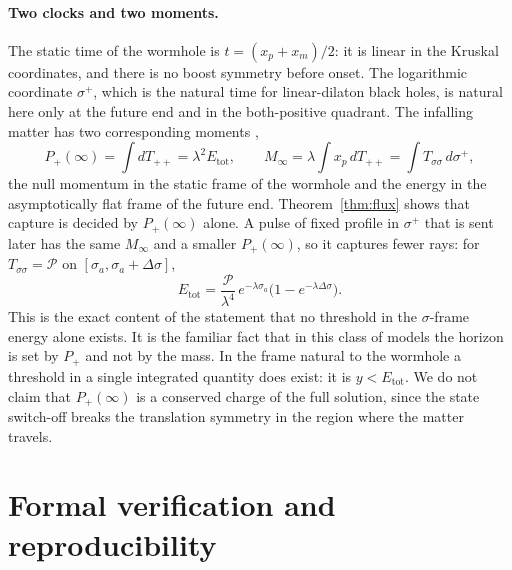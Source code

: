 \documentclass[11pt]{article}
\theoremstyle{remark}
\newcommand{\Etot}{E_{\mathrm{tot}}}
\begin{document}
\paragraph{Two clocks and two moments.} The static time of the wormhole is $t=(x_p+x_m)/2$: it is linear in the Kruskal coordinates, and there is no boost symmetry before onset. The logarithmic coordinate $\sigma^+$, which is the natural time for linear-dilaton black holes, is natural here only at the future end and in the both-positive quadrant. The infalling matter has two corresponding moments \cite{RST,Thorlacius},
\[
P_+(\infty)=\int dT_{++}=\lambda^2\Etot,\qquad M_\infty=\lambda\int x_p\,dT_{++}=\int T_{\sigma\sigma}\,d\sigma^+ ,
\]
the null momentum in the static frame of the wormhole and the energy in the asymptotically flat frame of the future end. Theorem~\ref{thm:flux} shows that capture is decided by $P_+(\infty)$ alone. A pulse of fixed profile in $\sigma^+$ that is sent later has the same $M_\infty$ and a smaller $P_+(\infty)$, so it captures fewer rays: for $T_{\sigma\sigma}=\mathcal P$ on $[\sigma_a,\sigma_a+\Delta\sigma]$,
\[
\Etot=\frac{\mathcal P}{\lambda^4}\,e^{-\lambda\sigma_a}\bigl(1-e^{-\lambda\Delta\sigma}\bigr).
\]
This is the exact content of the statement that no threshold in the $\sigma$-frame energy alone exists. It is the familiar fact that in this class of models the horizon is set by $P_+$ and not by the mass. In the frame natural to the wormhole a threshold in a single integrated quantity does exist: it is $y<\Etot$. We do not claim that $P_+(\infty)$ is a conserved charge of the full solution, since the state switch-off breaks the translation symmetry in the region where the matter travels.

\section{Formal verification and reproducibility}\label{sec:verify}
\end{document}
